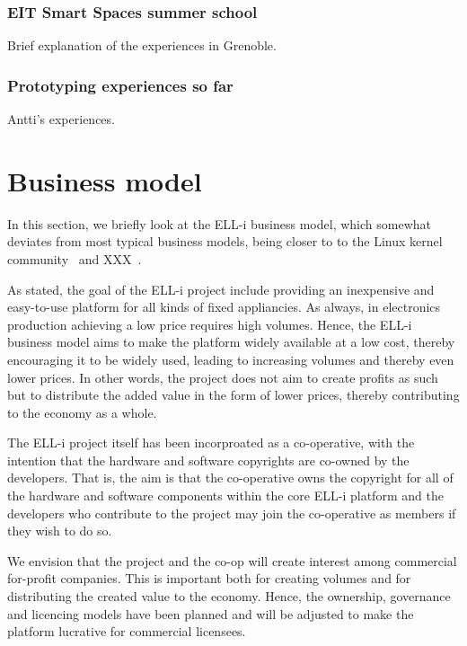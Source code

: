 \documentclass[draft,a4paper]{siamltex}
\begin{document}
\subsubsection{EIT Smart Spaces summer school}

Brief explanation of the experiences in Grenoble.

\subsubsection{Prototyping experiences so far}

Antti's experiences.
 

\section{Business model}
\label{sec:business}

In this section, we briefly look at the ELL-i business model, which
somewhat deviates from most typical business models, being closer to
to the Linux kernel community~\cite{Linux-kernel-need-reference}
and XXX~\cite{Something-else-need-reference}.

As stated, the goal of the ELL-i project include providing an
inexpensive and easy-to-use platform for all kinds of fixed
appliancies.  As always, in electronics production achieving a low
price requires high volumes.  Hence, the ELL-i business model aims to
make the platform widely available at a low cost, thereby encouraging
it to be widely used, leading to increasing volumes and thereby even
lower prices.  In other words, the project does not aim to
create profits as such but to distribute the added value in the form
of lower prices, thereby contributing to the economy as a whole.

The ELL-i project itself has been incorproated as a co-operative, with
the intention that the hardware and software copyrights are co-owned
by the developers.  That is, the aim is that the co-operative owns the
copyright for all of the hardware and software components within the
core ELL-i platform and the developers who contribute to the project
may join the co-operative as members if they wish to do so.

We envision that the project and the co-op will create interest among
commercial for-profit companies.  This is important both for creating
volumes and for distributing the created value to the economy.
Hence, the ownership, governance and licencing models have been
planned and will be adjusted to make the platform lucrative for
commercial licensees.
\end{document}
